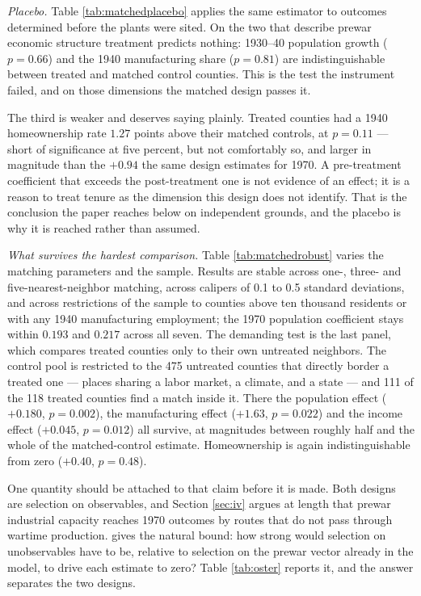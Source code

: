 \documentclass[12pt]{article}
\newcommand{\textcite}[1]{\citet{#1}}
\begin{document}
\emph{Placebo.} Table \ref{tab:matchedplacebo} applies the same estimator to
outcomes determined before the plants were sited. On the two that describe prewar
economic structure treatment predicts nothing: 1930--40 population growth
($p = 0.66$) and the 1940 manufacturing share ($p = 0.81$) are indistinguishable
between treated and matched control counties. This is the test the instrument
failed, and on those dimensions the matched design passes it.

The third is weaker and deserves saying plainly. Treated counties had a 1940
homeownership rate $1.27$ points above their matched controls, at $p = 0.11$ ---
short of significance at five percent, but not comfortably so, and larger in
magnitude than the $+0.94$ the same design estimates for 1970. A pre-treatment
coefficient that exceeds the post-treatment one is not evidence of an effect; it
is a reason to treat tenure as the dimension this design does not identify. That
is the conclusion the paper reaches below on independent grounds, and the placebo
is why it is reached rather than assumed.

\emph{What survives the hardest comparison.} Table \ref{tab:matchedrobust}
varies the matching parameters and the sample. Results are stable across one-,
three- and five-nearest-neighbor matching, across calipers of 0.1 to 0.5
standard deviations, and across restrictions of the sample to counties above
ten thousand residents or with any 1940 manufacturing employment; the 1970
population coefficient stays within $0.193$ and $0.217$ across all seven.
The demanding test is the last panel, which compares treated counties only to
their own untreated neighbors. The control pool is restricted to the 475
untreated counties that directly border a treated one --- places sharing a labor
market, a climate, and a state --- and 111 of the 118 treated counties find a
match inside it. There the population effect ($+0.180$, $p = 0.002$), the manufacturing
effect ($+1.63$, $p = 0.022$) and the income effect ($+0.045$, $p = 0.012$) all
survive, at magnitudes between roughly half and the whole of the matched-control
estimate. Homeownership is again indistinguishable from zero ($+0.40$,
$p = 0.48$).

One quantity should be attached to that claim before it is made. Both designs
are selection on observables, and Section \ref{sec:iv} argues at length that
prewar industrial capacity reaches 1970 outcomes by routes that do not pass
through wartime production. \textcite{oster2019} gives the natural bound: how
strong would selection on unobservables have to be, relative to selection on the
prewar vector already in the model, to drive each estimate to zero? Table
\ref{tab:oster} reports it, and the answer separates the two designs.
\end{document}
